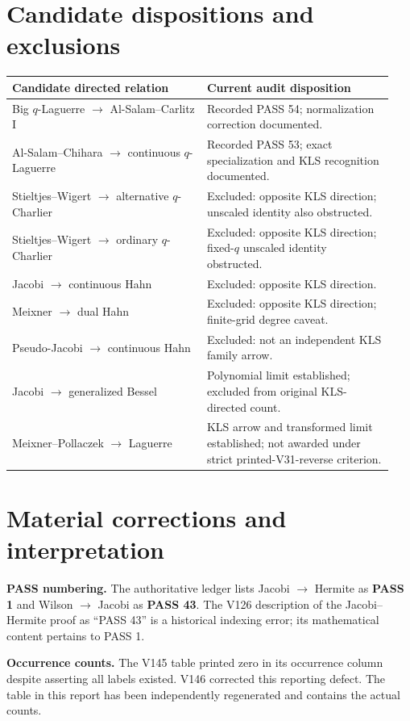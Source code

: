 \documentclass[10pt]{article}
\begin{document}
\section{Candidate dispositions and exclusions}
\begin{tabular}{@{}p{0.48\linewidth}p{0.46\linewidth}@{}}
\toprule Candidate directed relation & Current audit disposition\\\midrule
Big $q$-Laguerre $\to$ Al-Salam--Carlitz I & Recorded PASS 54; normalization correction documented.\\
Al-Salam--Chihara $\to$ continuous $q$-Laguerre & Recorded PASS 53; exact specialization and KLS recognition documented.\\
Stieltjes--Wigert $\to$ alternative $q$-Charlier & Excluded: opposite KLS direction; unscaled identity also obstructed.\\
Stieltjes--Wigert $\to$ ordinary $q$-Charlier & Excluded: opposite KLS direction; fixed-$q$ unscaled identity obstructed.\\
Jacobi $\to$ continuous Hahn & Excluded: opposite KLS direction.\\
Meixner $\to$ dual Hahn & Excluded: opposite KLS direction; finite-grid degree caveat.\\
Pseudo-Jacobi $\to$ continuous Hahn & Excluded: not an independent KLS family arrow.\\
Jacobi $\to$ generalized Bessel & Polynomial limit established; excluded from original KLS-directed count.\\
Meixner--Pollaczek $\to$ Laguerre & KLS arrow and transformed limit established; not awarded under strict printed-V31-reverse criterion.\\
\bottomrule
\end{tabular}

\section{Material corrections and interpretation}
\textbf{PASS numbering.} The authoritative ledger lists Jacobi $\to$ Hermite as \textbf{PASS 1} and Wilson $\to$ Jacobi as \textbf{PASS 43}. The V126 description of the Jacobi--Hermite proof as ``PASS 43'' is a historical indexing error; its mathematical content pertains to PASS 1.

\textbf{Occurrence counts.} The V145 table printed zero in its occurrence column despite asserting all labels existed. V146 corrected this reporting defect. The table in this report has been independently regenerated and contains the actual counts.
\end{document}

